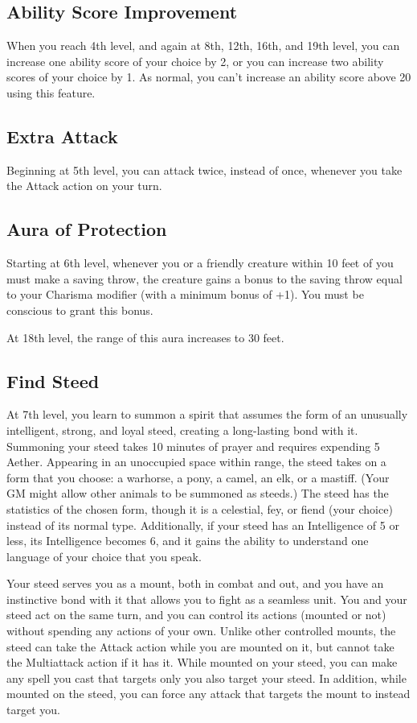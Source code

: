 \subsection{Ability Score Improvement}

When you reach 4th level, and again at 8th, 12th, 16th, and 19th level, you can increase one ability score of your choice by 2, or you can increase two ability scores of your choice by 1. As normal, you can't increase an ability score above 20 using this feature.

\subsection{Extra Attack}

Beginning at 5th level, you can attack twice, instead of once, whenever you take the Attack action on your turn.

\subsection{Aura of Protection}

Starting at 6th level, whenever you or a friendly creature within 10 feet of you must make a saving throw, the creature gains a bonus to the saving throw equal to your Charisma modifier (with a minimum bonus of +1). You must be conscious to grant this bonus.

At 18th level, the range of this aura increases to 30 feet.

\subsection{Find Steed}

At 7th level, you learn to summon a spirit that assumes the form of an unusually intelligent, strong, and loyal steed, creating a long-lasting bond with it. Summoning your steed takes 10 minutes of prayer and requires expending 5 Aether. Appearing in an unoccupied space within range, the steed takes on a form that you choose: a warhorse, a pony, a camel, an elk, or a mastiff. (Your GM might allow other animals to be summoned as steeds.) The steed has the statistics of the chosen form, though it is a celestial, fey, or fiend (your choice) instead of its normal type. Additionally, if your steed has an Intelligence of 5 or less, its Intelligence becomes 6, and it gains the ability to understand one language of your choice that you speak.

Your steed serves you as a mount, both in combat and out, and you have an instinctive bond with it that allows you to fight as a seamless unit. You and your steed act on the same turn, and you can control its actions (mounted or not) without spending any actions of your own. Unlike other controlled mounts, the steed can take the Attack action while you are mounted on it, but cannot take the Multiattack action if it has it. While mounted on your steed, you can make any spell you cast that targets only you also target your steed. In addition, while mounted on the steed, you can force any attack that targets the mount to instead target you.

